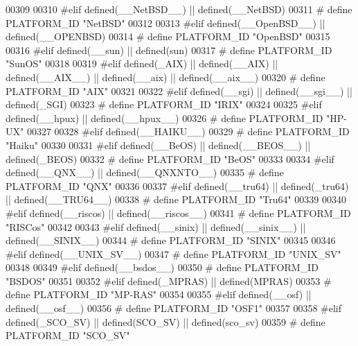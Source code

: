 \begin{DoxyCode}
{{{{{{{{{{{{{{{{{{{{{{{{{{{{{{{{{{{{00309 
00310 \textcolor{preprocessor}{#elif defined(\_\_NetBSD\_\_) || defined(\_\_NetBSD)}
00311 \textcolor{preprocessor}{# define PLATFORM\_ID "NetBSD"}
00312 
00313 \textcolor{preprocessor}{#elif defined(\_\_OpenBSD\_\_) || defined(\_\_OPENBSD)}
00314 \textcolor{preprocessor}{# define PLATFORM\_ID "OpenBSD"}
00315 
00316 \textcolor{preprocessor}{#elif defined(\_\_sun) || defined(sun)}
00317 \textcolor{preprocessor}{# define PLATFORM\_ID "SunOS"}
00318 
00319 \textcolor{preprocessor}{#elif defined(\_AIX) || defined(\_\_AIX) || defined(\_\_AIX\_\_) || defined(\_\_aix) || defined(\_\_aix\_\_)}
00320 \textcolor{preprocessor}{# define PLATFORM\_ID "AIX"}
00321 
00322 \textcolor{preprocessor}{#elif defined(\_\_sgi) || defined(\_\_sgi\_\_) || defined(\_SGI)}
00323 \textcolor{preprocessor}{# define PLATFORM\_ID "IRIX"}
00324 
00325 \textcolor{preprocessor}{#elif defined(\_\_hpux) || defined(\_\_hpux\_\_)}
00326 \textcolor{preprocessor}{# define PLATFORM\_ID "HP-UX"}
00327 
00328 \textcolor{preprocessor}{#elif defined(\_\_HAIKU\_\_)}
00329 \textcolor{preprocessor}{# define PLATFORM\_ID "Haiku"}
00330 
00331 \textcolor{preprocessor}{#elif defined(\_\_BeOS) || defined(\_\_BEOS\_\_) || defined(\_BEOS)}
00332 \textcolor{preprocessor}{# define PLATFORM\_ID "BeOS"}
00333 
00334 \textcolor{preprocessor}{#elif defined(\_\_QNX\_\_) || defined(\_\_QNXNTO\_\_)}
00335 \textcolor{preprocessor}{# define PLATFORM\_ID "QNX"}
00336 
00337 \textcolor{preprocessor}{#elif defined(\_\_tru64) || defined(\_tru64) || defined(\_\_TRU64\_\_)}
00338 \textcolor{preprocessor}{# define PLATFORM\_ID "Tru64"}
00339 
00340 \textcolor{preprocessor}{#elif defined(\_\_riscos) || defined(\_\_riscos\_\_)}
00341 \textcolor{preprocessor}{# define PLATFORM\_ID "RISCos"}
00342 
00343 \textcolor{preprocessor}{#elif defined(\_\_sinix) || defined(\_\_sinix\_\_) || defined(\_\_SINIX\_\_)}
00344 \textcolor{preprocessor}{# define PLATFORM\_ID "SINIX"}
00345 
00346 \textcolor{preprocessor}{#elif defined(\_\_UNIX\_SV\_\_)}
00347 \textcolor{preprocessor}{# define PLATFORM\_ID "UNIX\_SV"}
00348 
00349 \textcolor{preprocessor}{#elif defined(\_\_bsdos\_\_)}
00350 \textcolor{preprocessor}{# define PLATFORM\_ID "BSDOS"}
00351 
00352 \textcolor{preprocessor}{#elif defined(\_MPRAS) || defined(MPRAS)}
00353 \textcolor{preprocessor}{# define PLATFORM\_ID "MP-RAS"}
00354 
00355 \textcolor{preprocessor}{#elif defined(\_\_osf) || defined(\_\_osf\_\_)}
00356 \textcolor{preprocessor}{# define PLATFORM\_ID "OSF1"}
00357 
00358 \textcolor{preprocessor}{#elif defined(\_SCO\_SV) || defined(SCO\_SV) || defined(sco\_sv)}
00359 \textcolor{preprocessor}{# define PLATFORM\_ID "SCO\_SV"}
}}}}}}}}}}}}}}}}}}}}}}}}}}}}}}}}}}}}
\end{DoxyCode}
